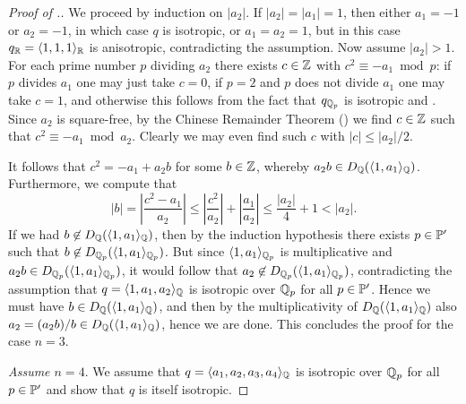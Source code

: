 \documentclass[12pt, leqno, british]{amsart}
\begin{document}
\begin{proof}[Proof of .]
We proceed by induction on $\lvert a_2 \rvert$.
If $\lvert a_2 \rvert = \lvert a_1 \rvert = 1$, then either $a_1 = -1$ or $a_2 = -1$, in which case $q$ is isotropic, or $a_1 = a_2 = 1$, but in this case $q_\mathbb R = \langle 1, 1, 1 \rangle_\mathbb R$ is anisotropic, contradicting the assumption.
Now assume $\lvert a_2 \rvert > 1$.
For each prime number $p$ dividing $a_2$ there exists $c \in \mathbb Z$ with $c^2 \equiv -a_1 \bmod p$: if $p$ divides $a_1$ one may just take $c = 0$, if $p = 2$ and $p$ does not divide $a_1$ one may take $c = 1$, and otherwise this follows from the fact that $q_{\mathbb Q_p}$ is isotropic and .
Since $a_2$ is square-free, by the Chinese Remainder Theorem () we find $c \in \mathbb Z$ such that $c^2 \equiv -a_1 \bmod a_2$.
Clearly we may even find such $c$ with $\lvert c \rvert \leq \lvert a_2 \rvert/2$.

It follows that $c^2 = -a_1 + a_2b$ for some $b \in \mathbb Z$, whereby $a_2b \in D_\mathbb Q(\langle 1, a_1 \rangle_\mathbb Q)$.
Furthermore, we compute that
$$ \lvert b \rvert = \left\lvert \frac{c^2 - a_1}{a_2} \right\rvert \leq \left\lvert \frac{c^2}{a_2} \right\rvert + \left\lvert \frac{a_1}{a_2} \right\rvert \leq \frac{\lvert a_2 \rvert}{4} + 1 < \lvert a_2 \rvert.$$
If we had $b \not\in D_\mathbb Q(\langle 1, a_1 \rangle_{\mathbb Q})$, then by the induction hypothesis there exists $p \in \mathbb P'$ such that $b \not\in D_{\mathbb Q_p}(\langle 1, a_1 \rangle_{\mathbb Q_p})$.
But since $\langle 1, a_1 \rangle_{\mathbb Q_p}$ is multiplicative and $a_2b \in D_{\mathbb Q_p}(\langle 1, a_1 \rangle_{\mathbb Q_p})$, it would follow that $a_2 \not\in  D_{\mathbb Q_p}(\langle 1, a_1 \rangle_{\mathbb Q_p})$, contradicting the assumption that $q = \langle 1, a_1, a_2 \rangle_{\mathbb Q}$ is isotropic over $\mathbb Q_p$ for all $p \in \mathbb P'$.
Hence we must have $b \in D_\mathbb Q(\langle 1, a_1 \rangle_{\mathbb Q})$, and then by the multiplicativity of $ D_\mathbb Q(\langle 1, a_1 \rangle_{\mathbb Q})$ also $a_2 = (a_2b)/b \in D_{\mathbb Q}(\langle 1, a_1 \rangle_{\mathbb Q})$, hence we are done.
This concludes the proof for the case $n = 3$.

\emph{Assume $n = 4$}.
We assume that $q = \langle a_1, a_2, a_3, a_4 \rangle_{\mathbb Q}$ is isotropic over $\mathbb Q_p$ for all $p \in \mathbb P'$ and show that $q$ is itself isotropic.


\end{proof}
\end{document}
